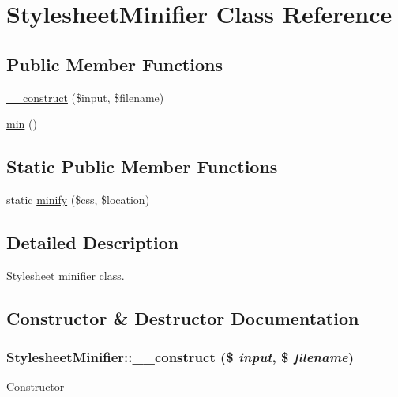 \hypertarget{classStylesheetMinifier}{
\section{StylesheetMinifier Class Reference}
\label{classStylesheetMinifier}
}
\subsection*{Public Member Functions}
\begin{DoxyCompactItemize}
\item 
\hyperlink{classStylesheetMinifier_a61996d7192bfa1c942f4c8932ea33d0c}{\_\-\_\-construct} (\$input, \$filename)
\item 
\hyperlink{classStylesheetMinifier_aa185a19e69c11f247a058e2c43dc73e8}{min} ()
\end{DoxyCompactItemize}
\subsection*{Static Public Member Functions}
\begin{DoxyCompactItemize}
\item 
static \hyperlink{classStylesheetMinifier_a2da30cbda1ae51979913dce518f7e2cb}{minify} (\$css, \$location)
\end{DoxyCompactItemize}


\subsection{Detailed Description}
Stylesheet minifier class. 

\subsection{Constructor \& Destructor Documentation}
\hypertarget{classStylesheetMinifier_a61996d7192bfa1c942f4c8932ea33d0c}{
\subsubsection[{\_\-\_\-construct}]{\setlength{\rightskip}{0pt plus 5cm}StylesheetMinifier::\_\-\_\-construct (\$ {\em input}, \/  \$ {\em filename})}}
\label{classStylesheetMinifier_a61996d7192bfa1c942f4c8932ea33d0c}
Constructor



